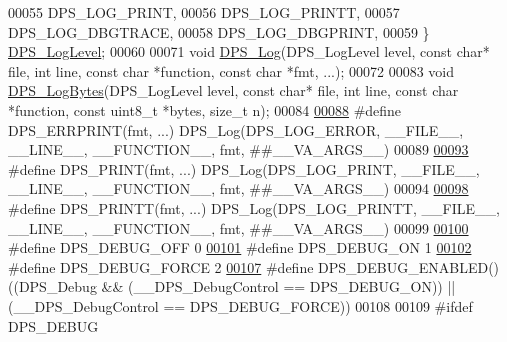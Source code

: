 \begin{DoxyCode}
00055     DPS\_LOG\_PRINT,
00056     DPS\_LOG\_PRINTT,
00057     DPS\_LOG\_DBGTRACE,
00058     DPS\_LOG\_DBGPRINT,
00059 \} \hyperlink{group__debug_gad06c0421a8226b0a95be1d722ca05612}{DPS\_LogLevel};
00060 
00071 \textcolor{keywordtype}{void} \hyperlink{group__debug_ga174fef61dca16376546e570c9b831502}{DPS\_Log}(DPS\_LogLevel level, \textcolor{keyword}{const} \textcolor{keywordtype}{char}* file, \textcolor{keywordtype}{int} line, \textcolor{keyword}{const} \textcolor{keywordtype}{char} *\textcolor{keyword}{function}, \textcolor{keyword}{const} \textcolor{keywordtype}{char} *fmt, 
      ...);
00072 
00083 \textcolor{keywordtype}{void} \hyperlink{group__debug_ga7cc66c1e82ef557238c122b067f5337a}{DPS\_LogBytes}(DPS\_LogLevel level, \textcolor{keyword}{const} \textcolor{keywordtype}{char}* file, \textcolor{keywordtype}{int} line, \textcolor{keyword}{const} \textcolor{keywordtype}{char} *\textcolor{keyword}{function}, \textcolor{keyword}{const} 
      uint8\_t *bytes, \textcolor{keywordtype}{size\_t} n);
00084 
\hyperlink{group__debug_gac69225c4b8e73b27204a2963d4ca0633}{00088} \textcolor{preprocessor}{#define DPS\_ERRPRINT(fmt, ...) DPS\_Log(DPS\_LOG\_ERROR, \_\_FILE\_\_, \_\_LINE\_\_, \_\_FUNCTION\_\_, fmt, ##\_\_VA\_ARGS\_\_)}
00089 
\hyperlink{group__debug_gaf1d25cc7f1d2d92f96ba620217af28fd}{00093} \textcolor{preprocessor}{#define DPS\_PRINT(fmt, ...) DPS\_Log(DPS\_LOG\_PRINT, \_\_FILE\_\_, \_\_LINE\_\_, \_\_FUNCTION\_\_, fmt, ##\_\_VA\_ARGS\_\_)}
00094 
\hyperlink{group__debug_gad9a3f4ae1ed318b313434a82132c4044}{00098} \textcolor{preprocessor}{#define DPS\_PRINTT(fmt, ...) DPS\_Log(DPS\_LOG\_PRINTT, \_\_FILE\_\_, \_\_LINE\_\_, \_\_FUNCTION\_\_, fmt, ##\_\_VA\_ARGS\_\_)}
00099 
\hyperlink{group__debug_ga39adc166f2ce05fb751212c1db9a6ce9}{00100} \textcolor{preprocessor}{#define DPS\_DEBUG\_OFF   0 }
\hyperlink{group__debug_ga777427dcd2750d5006024ce1a54daaac}{00101} \textcolor{preprocessor}{#define DPS\_DEBUG\_ON    1 }
\hyperlink{group__debug_ga6eb8eb8c3804ebd6f51fe2d7a7625ed8}{00102} \textcolor{preprocessor}{#define DPS\_DEBUG\_FORCE 2 }
\hyperlink{group__debug_gaeca5ec86966717c8dd2d1ffda4be2b3b}{00107} \textcolor{preprocessor}{#define DPS\_DEBUG\_ENABLED()  ((DPS\_Debug && (\_\_DPS\_DebugControl == DPS\_DEBUG\_ON)) || (\_\_DPS\_DebugControl ==
       DPS\_DEBUG\_FORCE))}
00108 
00109 \textcolor{preprocessor}{#ifdef DPS\_DEBUG}

\end{DoxyCode}
